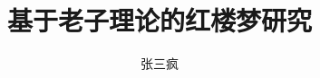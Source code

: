 \documentclass{sudathesis}                  %
\title{基于老子理论的红楼梦研究}            %
\author{张三疯}	                            %
\begin{document}
    \frontmatter                            %
    \tableofcontents                        %
    \listoffigures                          %
    \listoftables                           %
    \papertitle                             %

    \mainmatter                             %

    
    
    
    
    

\end{document}
